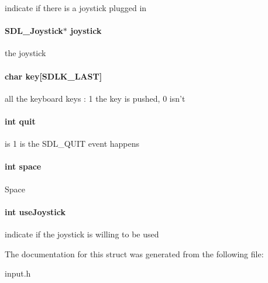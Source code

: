 indicate if there is a joystick plugged in \hypertarget{struct_input_a5fe6c6b426f70a21df07c64227b2c337}{
\paragraph[{joystick}]{\setlength{\rightskip}{0pt plus 5cm}S\-D\-L\-\_\-\-Joystick$\ast$ joystick}}\label{struct_input_a5fe6c6b426f70a21df07c64227b2c337}
the joystick \hypertarget{struct_input_afc4eabd057bd0061b56de4005f5ecbb8}{
\paragraph[{key}]{\setlength{\rightskip}{0pt plus 5cm}char key\mbox{[}S\-D\-L\-K\-\_\-\-L\-A\-S\-T\mbox{]}}}\label{struct_input_afc4eabd057bd0061b56de4005f5ecbb8}
all the keyboard keys \-: 1 the key is pushed, 0 isn't \hypertarget{struct_input_a2896431d6a80cd39b3d24b40237612ee}{
\paragraph[{quit}]{\setlength{\rightskip}{0pt plus 5cm}int quit}}\label{struct_input_a2896431d6a80cd39b3d24b40237612ee}
is 1 is the S\-D\-L\-\_\-\-Q\-U\-I\-T event happens \hypertarget{struct_input_ab05991ed532329184893692211b355fa}{
\paragraph[{space}]{\setlength{\rightskip}{0pt plus 5cm}int space}}\label{struct_input_ab05991ed532329184893692211b355fa}
Space \hypertarget{struct_input_a66b84ad51037935b993fc2b860b15cb6}{
\paragraph[{use\-Joystick}]{\setlength{\rightskip}{0pt plus 5cm}int use\-Joystick}}\label{struct_input_a66b84ad51037935b993fc2b860b15cb6}
indicate if the joystick is willing to be used 

The documentation for this struct was generated from the following file\-:\begin{DoxyCompactItemize}
\item 
input.\-h\end{DoxyCompactItemize}
